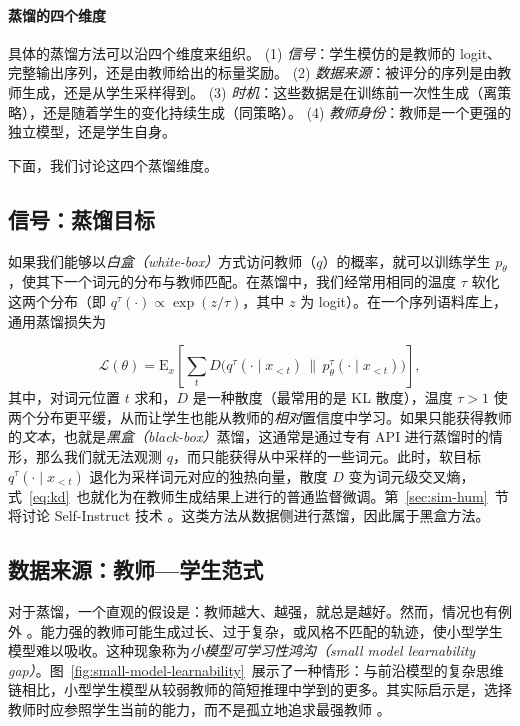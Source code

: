 \paragraph{蒸馏的四个维度}
具体的蒸馏方法可以沿四个维度来组织。
(1) {\em 信号}：学生模仿的是教师的 logit、完整输出序列，还是由教师给出的标量奖励。
(2) {\em 数据来源}：被评分的序列是由教师生成，还是从学生采样得到。
(3) {\em 时机}：这些数据是在训练前一次性生成（离策略），还是随着学生的变化持续生成（同策略）。
(4) {\em 教师身份}：教师是一个更强的独立模型，还是学生自身。

下面，我们讨论这四个蒸馏维度。

\subsection{信号：蒸馏目标}
如果我们能够以{\em 白盒（white-box）}方式访问教师（$q$）的概率，就可以训练学生 $p_\theta$，使其下一个词元的分布与教师匹配。在蒸馏中，我们经常用相同的温度 $\tau$ 软化这两个分布（即 $q^{\tau}(\cdot) \propto \exp(z/\tau)$，其中 $z$ 为 logit）。在一个序列语料库上，通用蒸馏损失为

\begin{equation}
    \mathcal{L}(\theta) = \mathrm{E}_{x}\left[ \sum_{t} D\big( q^{\tau}(\cdot \mid x_{<t}) \,\|\, p^{\tau}_\theta(\cdot \mid x_{<t}) \big) \right],
    \label{eq:kd}
\end{equation}
其中，对词元位置 $t$ 求和，$D$ 是一种散度（最常用的是 KL 散度），温度 $\tau > 1$ 使两个分布更平缓，从而让学生也能从教师的{\em 相对}置信度中学习。如果只能获得教师的{\em 文本}，也就是{\em 黑盒（black-box）}蒸馏，这通常是通过专有 API 进行蒸馏时的情形，那么我们就无法观测 $q$，而只能获得从中采样的一些词元。此时，软目标 $q^{\tau}(\cdot \mid x_{<t})$ 退化为采样词元对应的独热向量，散度 $D$ 变为词元级交叉熵，式~\ref{eq:kd}~也就化为在教师生成结果上进行的普通监督微调。第~\ref{sec:sim-hum}~节将讨论 Self-Instruct 技术 \citep{wang-etal-2023-self-instruct}。这类方法从数据侧进行蒸馏，因此属于黑盒方法。


\subsection{数据来源：教师—学生范式}
对于蒸馏，一个直观的假设是：教师越大、越强，就总是越好。然而，情况也有例外 \citep{xu-etal-2025-stronger, li-etal-2025-small-models}。能力强的教师可能生成过长、过于复杂，或风格不匹配的轨迹，使小型学生模型难以吸收。这种现象称为{\em 小模型可学习性鸿沟（small model learnability gap）}。图~\ref{fig:small-model-learnability}~展示了一种情形：与前沿模型的复杂思维链相比，小型学生模型从较弱教师的简短推理中学到的更多。其实际启示是，选择教师时应参照学生当前的能力，而不是孤立地追求最强教师 \citep{zhang-etal-2026-find}。

